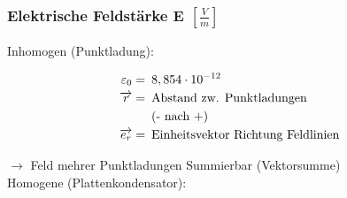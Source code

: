 \subsubsection*{Elektrische Feldstärke E $\left[\frac{V}{m}\right]$}

    Inhomogen (Punktladung):
    \vspace{-1mm}
    \begin{minipage}{0.53\linewidth}
        \begin{footnotesize}
            \begin{center}
            \end{center}
        \end{footnotesize}
    \end{minipage}
    \vspace{1mm}
    \begin{minipage}{0.46\linewidth}
        \begin{scriptsize}
            \begin{center}
                \begin{align*}
                    \varepsilon_0 = &\enspace 8,854\cdot10^{-12}
                    \\\overrightarrow{r} = &\text{\enspace Abstand zw. Punktladungen}
                    \\&\text{\enspace(- nach +)}
                    \\\overrightarrow{e_r} = &\text{\enspace Einheitsvektor Richtung Feldlinien}
                \end{align*}
            \end{center}
        \end{scriptsize}
    \end{minipage}
    \vspace{2mm}
    $\longrightarrow$ Feld mehrer Punktladungen Summierbar (Vektorsumme)\\
    Homogene (Plattenkondensator):

